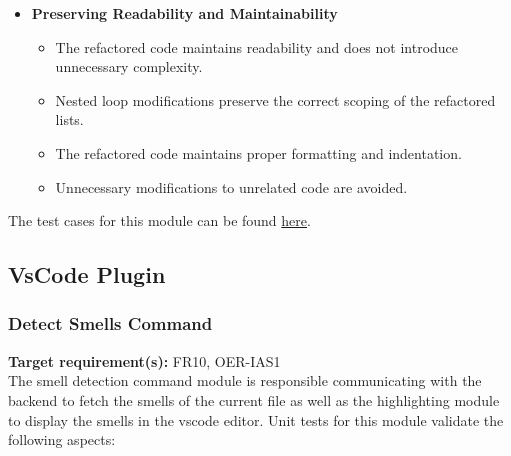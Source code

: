 \documentclass[12pt, titlepage]{article}
\begin{document}
\begin{itemize}
    \item \textbf{Preserving Readability and Maintainability}
    \begin{itemize}
        \item The refactored code maintains readability and does not introduce unnecessary complexity.
        \item Nested loop modifications preserve the correct scoping of the refactored lists.
        \item The refactored code maintains proper formatting and indentation.
        \item Unnecessary modifications to unrelated code are avoided.
    \end{itemize}
\end{itemize}

\noindent The test cases for this module can be found \href{https://github.com/ssm-lab/capstone--source-code-optimizer/blob/new-poc/tests/refactorers/test_str_concat_in_loop_refactor.py}{here}.


\subsection{VsCode Plugin}

\subsubsection{Detect Smells Command}

\textbf{Target requirement(s):} FR10, OER-IAS1~\cite{SRS} \\

\noindent
The smell detection command module is responsible communicating with the backend to fetch the smells of the current file as well as the highlighting module to display the smells in the vscode editor. Unit tests for this module validate the following aspects:
\end{document}
